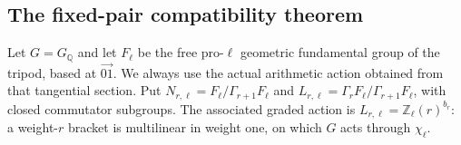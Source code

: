 \subsection{The fixed-pair compatibility theorem}

Let $G=G_{\mathbb Q}$ and let $F_\ell$ be the free pro-$\ell$
geometric fundamental group of the tripod, based at $\overrightarrow{01}$.
We always use the actual arithmetic action obtained from that tangential
section. Put $N_{r,\ell}=F_\ell/\Gamma_{r+1}F_\ell$ and
$L_{r,\ell}=\Gamma_rF_\ell/\Gamma_{r+1}F_\ell$, with closed
commutator subgroups. The associated graded action is
$L_{r,\ell}=\mathbb Z_\ell(r)^{b_r}$: a weight-$r$ bracket is
multilinear in weight one, on which $G$ acts through $\chi_\ell$.

